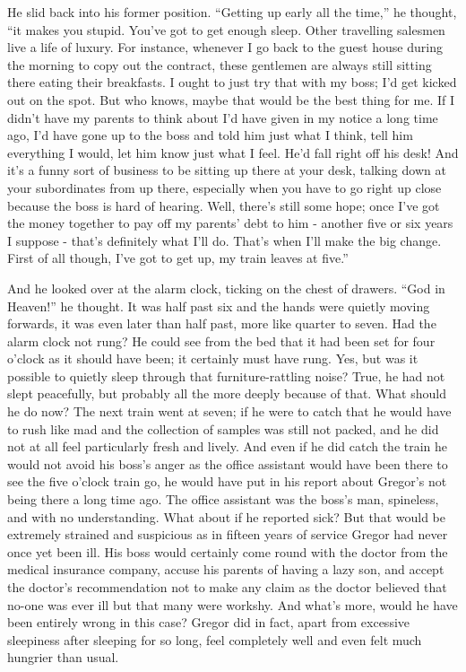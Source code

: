 \documentclass[12pt]{report}
\begin{document}
He slid back into his former position. ``Getting up early all the
time,'' he thought, ``it makes you stupid. You've got to get enough
sleep. Other travelling salesmen live a life of luxury. For instance,
whenever I go back to the guest house during the morning to copy out the
contract, these gentlemen are always still sitting there eating their
breakfasts. I ought to just try that with my boss; I'd get kicked out on
the spot. But who knows, maybe that would be the best thing for me. If I
didn't have my parents to think about I'd have given in my notice a long
time ago, I'd have gone up to the boss and told him just what I think,
tell him everything I would, let him know just what I feel. He'd fall
right off his desk! And it's a funny sort of business to be sitting up
there at your desk, talking down at your subordinates from up there,
especially when you have to go right up close because the boss is hard
of hearing. Well, there's still some hope; once I've got the money
together to pay off my parents' debt to him - another five or six years
I suppose - that's definitely what I'll do. That's when I'll make the
big change. First of all though, I've got to get up, my train leaves at
five.''

And he looked over at the alarm clock, ticking on the chest of drawers.
``God in Heaven!'' he thought. It was half past six and the hands were
quietly moving forwards, it was even later than half past, more like
quarter to seven. Had the alarm clock not rung? He could see from the
bed that it had been set for four o'clock as it should have been; it
certainly must have rung. Yes, but was it possible to quietly sleep
through that furniture-rattling noise? True, he had not slept
peacefully, but probably all the more deeply because of that. What
should he do now? The next train went at seven; if he were to catch that
he would have to rush like mad and the collection of samples was still
not packed, and he did not at all feel particularly fresh and lively.
And even if he did catch the train he would not avoid his boss's anger
as the office assistant would have been there to see the five o'clock
train go, he would have put in his report about Gregor's not being there
a long time ago. The office assistant was the boss's man, spineless, and
with no understanding. What about if he reported sick? But that would be
extremely strained and suspicious as in fifteen years of service Gregor
had never once yet been ill. His boss would certainly come round with
the doctor from the medical insurance company, accuse his parents of
having a lazy son, and accept the doctor's recommendation not to make
any claim as the doctor believed that no-one was ever ill but that many
were workshy. And what's more, would he have been entirely wrong in this
case? Gregor did in fact, apart from excessive sleepiness after sleeping
for so long, feel completely well and even felt much hungrier than
usual.
\end{document}
